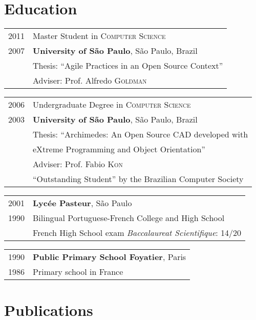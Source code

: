 \documentclass[letter,10pt]{article}
\begin{document}
\section{Education}
\begin{tabular}{p{2.5cm}l}
  \textsc{2011} & Master Student in \textsc{Computer Science}\\
  \textsc{2007} & \textbf{University of São Paulo}, São Paulo, Brazil\\
  & Thesis: ``Agile Practices in an Open Source Context''\\
  & \small Adviser: Prof. Alfredo \textsc{Goldman}\\
\end{tabular}

\begin{tabular}{p{2.5cm}l}
  \textsc{2006} & Undergraduate Degree in \textsc{Computer Science}\\
  \textsc{2003} &\normalsize\textbf{University of São Paulo}, São
  Paulo, Brazil\\
  & Thesis: ``Archimedes: An Open Source CAD developed with\\
  & eXtreme Programming and Object Orientation''\\
  & \small Adviser: Prof. Fabio \textsc{Kon}\\
  & ``Outstanding Student'' by the Brazilian Computer Society\\
\end{tabular}

\begin{tabular}{p{2.5cm}l}
  \textsc{2001} & \textbf{Lycée Pasteur}, São Paulo\\
  \textsc{1990} & Bilingual Portuguese-French College and High School\\
  & French High School exam \textit{Baccalaureat Scientifique}: 14/20
\end{tabular}

\begin{tabular}{p{2.5cm}l}
  \textsc{1990} & \textbf{Public Primary School Foyatier}, Paris\\
  \textsc{1986} & Primary school in France\\
\end{tabular}

\section{Publications}
\end{document}
